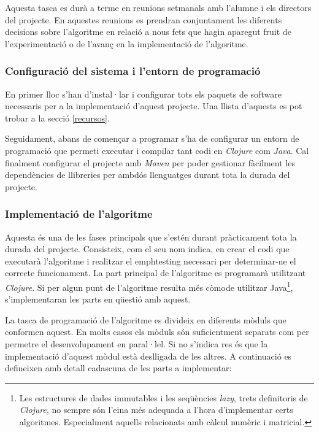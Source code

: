 \documentclass[10pt,a4paper]{article}
\begin{document}
Aquesta tasca es durà a terme en reunions setmanals amb l'alumne i els directors del projecte. En aquestes reunions es prendran conjuntament les diferents decisions sobre l'algoritme en relació a nous fets que hagin aparegut fruit de l'experimentació o de l'avanç en la implementació de l'algoritme.

\subsubsection{Configuració del sistema i l'entorn de programació}

En primer lloc s'han d'instal·lar i configurar tots els paquets de software necessaris per a la implementació d'aquest projecte. Una llista d'aquests es pot trobar a la secció \ref{recursos}.

Seguidament, abans de començar a programar s'ha de configurar un entorn de programació que permeti executar i compilar tant codi en \emph{Clojure} com \emph{Java}. Cal finalment configurar el projecte amb \emph{Maven} per poder gestionar fàcilment les dependències de llibreries per ambdós llenguatges durant tota la durada del projecte.

\subsubsection{Implementació de l'algoritme}

Aquesta és una de les fases principals que s'estén durant pràcticament tota la durada del projecte. Consisteix, com el seu nom indica, en crear el codi que executarà l'algoritme i realitzar el emph{testing} necessari per determinar-ne el correcte funcionament. La part principal de l'algoritme es programarà utilitzant \emph{Clojure}. Si per algun punt de l'algoritme resulta més còmode utilitzar Java\footnote{Les estructures de dades immutables i les seqüències \emph{lazy}, trets definitoris de \emph{Clojure}, no sempre són l'eina més adequada a l'hora d'implementar certs algoritmes. Especialment aquells relacionats amb càlcul numèric i matricial.}, s'implementaran les parts en qüestió amb aquest.

La tasca de programació de l'algoritme es divideix en diferents mòduls que conformen aquest. En molts casos els mòduls són suficientment separats com per permetre el desenvolupament en paral·lel. Si no s'indica res és que la implementació d'aquest mòdul està deslligada de les altres. A continuació es defineixen amb detall cadascuna de les parts a implementar:
\end{document}
